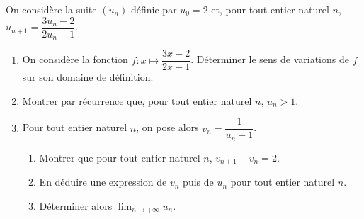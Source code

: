\documentclass[11pt,fleqn]{book} %
\begin{document}
\begin{exercise}[topic=lim02]On considère la suite $(u_n)$ définie par $u_0=2$ et, pour tout entier naturel $n$, $u_{n+1}=\dfrac{3u_n-2}{2u_n-1}$.

\begin{enumerate}
\item On considère la fonction $f: x\mapsto \dfrac{3x-2}{2x-1}$. Déterminer le sens de variations de $f$ sur son domaine de définition.
\item Montrer par récurrence que, pour tout entier naturel $n$, $u_n>1$.

\item Pour tout entier naturel $n$, on pose alors $v_n= \dfrac{1}{u_n-1}$.
\begin{enumerate}
\item Montrer que pour tout entier naturel $n$, $v_{n+1}-v_n=2$.
\item En déduire une expression de $v_n$ puis de $u_n$ pour tout entier naturel $n$.
\item Déterminer alors $\displaystyle\lim_{n \to +\infty}u_n$.
\end{enumerate}\end{enumerate}\end{exercise}
\end{document}
